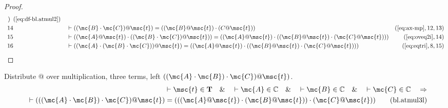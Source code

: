\begin{proof}
\begin{align}
\begin{array}{c}
     )
     \end{array}
     &(\mbox{\ref{eq:df-bl.atmul2}})\notag
  \\ 14 &&  & \vdash ( ( \mc{B} \cdot \mc{C} ) @ \msc{t} ) = ( ( \mc{B} @ \msc{t} ) \cdot ( C
     @ \msc{t} ) )&(\mbox{\ref{eq:ax-mp}},12,13)\notag
  \\ 15 &&  & \vdash ( ( \mc{A} @ \msc{t} ) \cdot ( ( \mc{B} \cdot \mc{C} ) @ \msc{t} ) ) = (
     ( \mc{A} @ \msc{t} ) \cdot ( ( \mc{B} @ \msc{t} ) \cdot ( \mc{C} @
     \msc{t} ) ) )&(\mbox{\ref{eq:oveq2i}},14)\notag
  \\ 16 &&  & \vdash ( ( \mc{A} \cdot ( \mc{B} \cdot \mc{C} ) ) @ \msc{t} ) = ( ( \mc{A} @ \msc{t}
     ) \cdot ( ( \mc{B} @ \msc{t} ) \cdot ( \mc{C} @ \msc{t} ) )
     )&(\mbox{\ref{eq:eqtri}},8,15)\notag
\end{align}
\end{proof}

\begin{lemma} {Distribute @ over multiplication, three
terms, left} $( ( \mc{A} \cdot \mc{B} ) \cdot \mc{C} ) @ \msc{t} )$.
\begin{align}
\vdash \msc{t} \in \mathbf{T}\quad\&\quad \vdash \mc{A} \in \mathbb{C}\quad\&\quad
    \vdash \mc{B} \in \mathbb{C}\quad\&\quad \vdash \mc{C} \in
    \mathbb{C}\quad\Rightarrow \notag \\ \quad \vdash ( ( ( \mc{A} \cdot \mc{B} ) \cdot \mc{C} ) @
    \msc{t} ) = ( ( ( \mc{A} @ \msc{t} ) \cdot ( \mc{B} @ \msc{t} ) ) \cdot ( \mc{C} @ \msc{t}
    ) )\label{eq:bl.atmul3l}\tag{bl.atmul3l}
\end{align}
\end{lemma}


